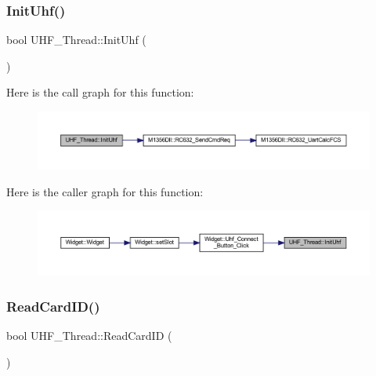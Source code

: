 \subsubsection{\texorpdfstring{InitUhf()}{InitUhf()}}
{\footnotesize\ttfamily bool U\+H\+F\+\_\+\+Thread\+::\+Init\+Uhf (\begin{DoxyParamCaption}{ }\end{DoxyParamCaption})}

Here is the call graph for this function\+:
\nopagebreak
\begin{figure}[H]
\begin{center}
\leavevmode
\includegraphics[width=350pt]{class_u_h_f___thread_a0bb3c8d9ac1290986ce318819dc4ecbf_cgraph}
\end{center}
\end{figure}
Here is the caller graph for this function\+:
\nopagebreak
\begin{figure}[H]
\begin{center}
\leavevmode
\includegraphics[width=350pt]{class_u_h_f___thread_a0bb3c8d9ac1290986ce318819dc4ecbf_icgraph}
\end{center}
\end{figure}
\mbox{\label{class_u_h_f___thread_a6dcb8fe026e47d35c7d992b860c86492}} 
\subsubsection{\texorpdfstring{ReadCardID()}{ReadCardID()}}
{\footnotesize\ttfamily bool U\+H\+F\+\_\+\+Thread\+::\+Read\+Card\+ID (\begin{DoxyParamCaption}{ }\end{DoxyParamCaption})}

